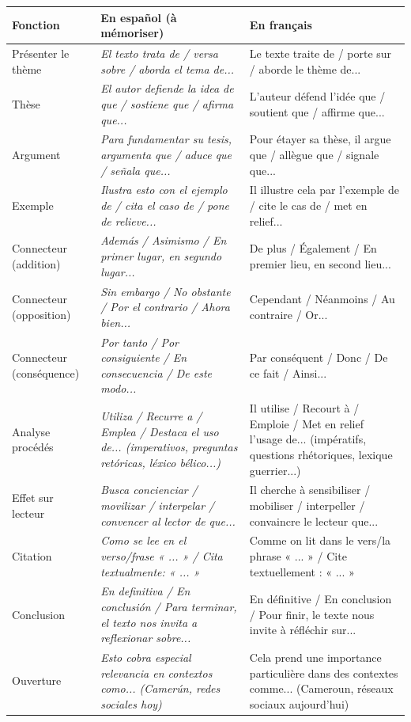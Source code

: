 \documentclass[11pt]{article}
\newcommand{\esp}[1]{\ifmmode\text{\textit{#1}}\else\begingroup\selectlanguage{spanish}\itshape #1\endgroup\fi}
\begin{document}
\begin{propriete}
\begin{center}
\begin{tabularx}{\linewidth}{|X|X|X|}
\hline
\rowcolor{popblueL} \textbf{Fonction} & \textbf{En español (à mémoriser)} & \textbf{En français} \\
\hline
Présenter le thème & \esp{El texto trata de / versa sobre / aborda el tema de...} & Le texte traite de / porte sur / aborde le thème de... \\
\hline
Thèse & \esp{El autor defiende la idea de que / sostiene que / afirma que...} & L'auteur défend l'idée que / soutient que / affirme que... \\
\hline
Argument & \esp{Para fundamentar su tesis, argumenta que / aduce que / señala que...} & Pour étayer sa thèse, il argue que / allègue que / signale que... \\
\hline
Exemple & \esp{Ilustra esto con el ejemplo de / cita el caso de / pone de relieve...} & Il illustre cela par l'exemple de / cite le cas de / met en relief... \\
\hline
Connecteur (addition) & \esp{Además / Asimismo / En primer lugar, en segundo lugar...} & De plus / Également / En premier lieu, en second lieu... \\
\hline
Connecteur (opposition) & \esp{Sin embargo / No obstante / Por el contrario / Ahora bien...} & Cependant / Néanmoins / Au contraire / Or... \\
\hline
Connecteur (conséquence) & \esp{Por tanto / Por consiguiente / En consecuencia / De este modo...} & Par conséquent / Donc / De ce fait / Ainsi... \\
\hline
Analyse procédés & \esp{Utiliza / Recurre a / Emplea / Destaca el uso de... (imperativos, preguntas retóricas, léxico bélico...)} & Il utilise / Recourt à / Emploie / Met en relief l'usage de... (impératifs, questions rhétoriques, lexique guerrier...) \\
\hline
Effet sur lecteur & \esp{Busca concienciar / movilizar / interpelar / convencer al lector de que...} & Il cherche à sensibiliser / mobiliser / interpeller / convaincre le lecteur que... \\
\hline
Citation & \esp{Como se lee en el verso/frase « ... » / Cita textualmente: « ... »} & Comme on lit dans le vers/la phrase « ... » / Cite textuellement : « ... » \\
\hline
Conclusion & \esp{En definitiva / En conclusión / Para terminar, el texto nos invita a reflexionar sobre...} & En définitive / En conclusion / Pour finir, le texte nous invite à réfléchir sur... \\
\hline
Ouverture & \esp{Esto cobra especial relevancia en contextos como... (Camerún, redes sociales hoy)} & Cela prend une importance particulière dans des contextes comme... (Cameroun, réseaux sociaux aujourd'hui) \\
\hline
\end{tabularx}
\end{center}
\end{propriete}
\end{document}
